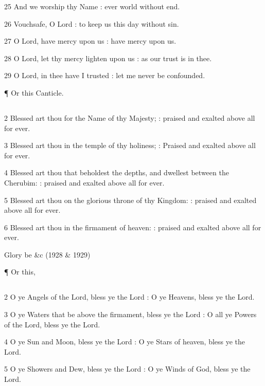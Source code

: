 25 And we worship thy Name : ever world without end.

26 Vouchsafe, O Lord : to keep us this day without sin.

27 O Lord, have mercy upon us : have mercy upon us.

28 O Lord, let thy mercy lighten upon us : as our trust is in thee.

29 O Lord, in thee have I trusted : let me never be confounded.

¶ Or this Canticle.

\subsection{}

2 Blessed art thou for the Name of thy Majesty; : praised and exalted above all for ever.

3 Blessed art thou in the temple of thy holiness; : Praised and exalted above all for ever.

4 Blessed art thou that beholdest the depths, and dwellest between the Cherubim: : praised and exalted above all for ever.

5 Blessed art thou on the glorious throne of thy Kingdom: : praised and exalted above all for ever.

6 Blessed art thou in the firmament of heaven: : praised and exalted above all for ever.

Glory be \&c (1928 \& 1929)

    ¶ Or this,
\subsection{}

    

2 O ye Angels of the Lord, bless ye the Lord : O ye Heavens, bless ye the Lord.

3 O ye Waters that be above the firmament, bless ye the Lord : O all ye Powers of the Lord, bless ye the Lord.

4 O ye Sun and Moon, bless ye the Lord : O ye Stars of heaven, bless ye the Lord.

5 O ye Showers and Dew, bless ye the Lord : O ye Winds of God, bless ye the Lord.


